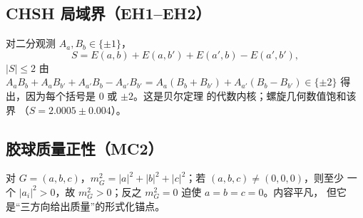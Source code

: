 \documentclass[aps,prd,preprint,superscriptaddress,amsmath,amssymb]{revtex4-2}
\begin{document}
\subsection{CHSH 局域界（EH1--EH2）}\label{app:chsh}

对二分观测 $A_a,B_b\in\{\pm1\}$，
\[
S = E(a,b)+E(a,b')+E(a',b)-E(a',b'),
\]
$|S|\leq2$ 由 $A_aB_b+A_aB_{b'}+A_{a'}B_b-A_{a'}B_{b'}
=A_a(B_b+B_{b'})+A_{a'}(B_b-B_{b'})\in\{\pm2\}$ 得出，因为每个括号是 $0$
或 $\pm2$。这是贝尔定理 \cite{Bell1964} 的代数内核；螺旋几何数值饱和该界
（$S=2.0005\pm0.004$）。

\subsection{胶球质量正性（MC2）}\label{app:mc2}

对 $G=(a,b,c)$，$m_G^2=|a|^2+|b|^2+|c|^2$；若 $(a,b,c)\neq(0,0,0)$，则至少
一个 $|a_i|^2>0$，故 $m_G^2>0$；反之 $m_G^2=0$ 迫使 $a=b=c=0$。内容平凡，
但它是``三方向给出质量''的形式化锚点。
\end{document}

